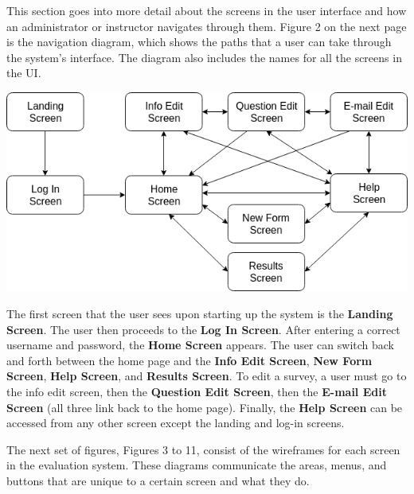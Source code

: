 \documentclass{article}
\begin{document}
This section goes into more detail about the screens in the user interface and how an administrator or instructor navigates through them. Figure 2 on the next page is the navigation diagram, which shows the paths that a user can take through the system's interface. The diagram also includes the names for all the screens in the UI.

\newpage

\begin{center}
\vspace{3mm}
{\includegraphics[scale=0.6]{images/navigation_diagram.png}}
\vspace{2mm}
\end{center}

The first screen that the user sees upon starting up the system is the \textbf{Landing Screen}. The user then proceeds to the \textbf{Log In Screen}. After entering a correct username and password, the \textbf{Home Screen} appears. The user can switch back and forth between the home page and the \textbf{Info Edit Screen}, \textbf{New Form Screen}, \textbf{Help Screen}, and \textbf{Results Screen}. To edit a survey, a user must go to the info edit screen, then the \textbf{Question Edit Screen}, then the \textbf{E-mail Edit Screen} (all three link back to the home page). Finally, the \textbf{Help Screen} can be accessed from any other screen except the landing and log-in screens.

The next set of figures, Figures 3 to 11, consist of the wireframes for each screen in the evaluation system. These diagrams communicate the areas, menus, and buttons that are unique to a certain screen and what they do.
\end{document}
